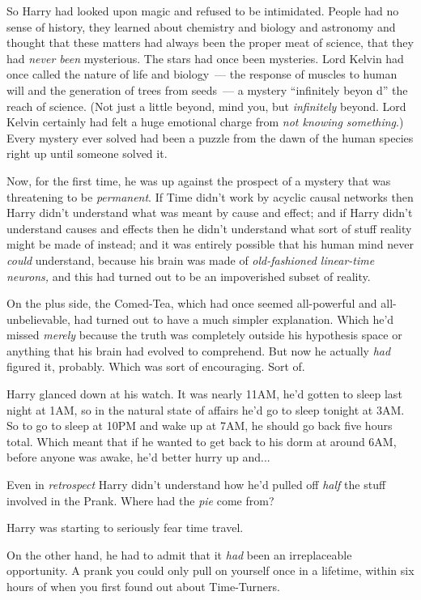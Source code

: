 So Harry had looked upon magic and refused to be intimidated. People had no sense of history, they learned about chemistry and biology and astronomy and thought that these matters had always been the proper meat of science, that they had \emph{never been} mysterious. The stars had once been mysteries. Lord Kelvin had once called the nature of life and biology~--- the response of muscles to human will and the generation of trees from seeds~--- a mystery ``infinitely beyon d'' the reach of science. (Not just a little beyond, mind you, but \emph{infinitely} beyond. Lord Kelvin certainly had felt a huge emotional charge from \emph{not knowing something}.) Every mystery ever solved had been a puzzle from the dawn of the human species right up until someone solved it.

Now, for the first time, he was up against the prospect of a mystery that was threatening to be \emph{permanent}. If Time didn't work by acyclic causal networks then Harry didn't understand what was meant by cause and effect; and if Harry didn't understand causes and effects then he didn't understand what sort of stuff reality might be made of instead; and it was entirely possible that his human mind never \emph{could} understand, because his brain was made of \emph{old-fashioned linear-time neurons,} and this had turned out to be an impoverished subset of reality.

On the plus side, the Comed-Tea, which had once seemed all-powerful and all-unbelievable, had turned out to have a much simpler explanation. Which he'd missed \emph{merely} because the truth was completely outside his hypothesis space or anything that his brain had evolved to comprehend. But now he actually \emph{had} figured it, probably. Which was sort of encouraging. Sort of.

Harry glanced down at his watch. It was nearly 11AM, he'd gotten to sleep last night at 1AM, so in the natural state of affairs he'd go to sleep tonight at 3AM. So to go to sleep at 10PM and wake up at 7AM, he should go back five hours total. Which meant that if he wanted to get back to his dorm at around 6AM, before anyone was awake, he'd better hurry up and...

Even in \emph{retrospect} Harry didn't understand how he'd pulled off \emph{half} the stuff involved in the Prank. Where had the \emph{pie} come from?

Harry was starting to seriously fear time travel.

On the other hand, he had to admit that it \emph{had} been an irreplaceable opportunity. A prank you could only pull on yourself once in a lifetime, within six hours of when you first found out about Time-Turners.

